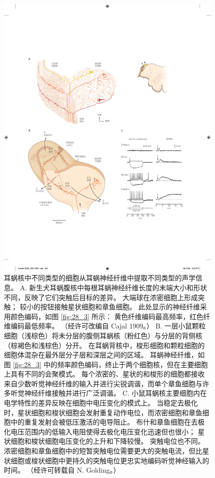 \begin{figure}[htbp]
	\centering
	\includegraphics[width=0.9\linewidth]{chap28/fig_28_4}
	\caption{耳蜗核中不同类型的细胞从耳蜗神经纤维中提取不同类型的声学信息。
		A. 新生犬耳蜗腹核中每根耳蜗神经纤维长度的末端大小和形状不同，反映了它们突触后目标的差异。 
		大端球在浓密细胞上形成突触； 
		较小的按钮接触星状细胞和章鱼细胞。 
		此处显示的神经纤维采用颜色编码，如图 \ref{fig:28_3} 所示：
		黄色纤维编码最高频率，红色纤维编码最低频率。 （经许可改编自 Cajal 1909。） 
		B. 一层小鼠颗粒细胞（浅棕色）将未分层的腹侧耳蜗核（粉红色）与分层的背侧核（棕褐色和浅棕色）分开。 
		在耳蜗背核中，梭形细胞和颗粒细胞的细胞体混杂在最外层分子层和深层之间的区域。
		耳蜗神经纤维，如图 \ref{fig:28_3} 中的频率颜色编码，终止于两个细胞核，但在主要细胞上具有不同的会聚模式。
		每个浓密的、星状的和梭形的细胞都接收来自少数听觉神经纤维的输入并进行尖锐调谐，而单个章鱼细胞与许多听觉神经纤维接触并进行广泛调谐。
		C. 小鼠耳蜗核主要细胞内在电学特性的差异反映在细胞中电压变化的模式上。 当稳定去极化时，星状细胞和梭状细胞会发射重复动作电位，而浓密细胞和章鱼细胞中的重复发射会被低压激活的电导阻止。 布什和章鱼细胞在去极化电压范围内的低输入电阻使得去极化电压变化迅速但也很小； 星状细胞和梭状细胞电压变化的上升和下降较慢。 突触电位也不同。 浓密细胞和章鱼细胞中的短暂突触电位需要更大的突触电流，但比星状细胞或梭状细胞中更持久的突触电位更忠实地编码听觉神经输入的时间。 （经许可转载自 N. Golding。）}
	\label{fig:28_4}
\end{figure}

